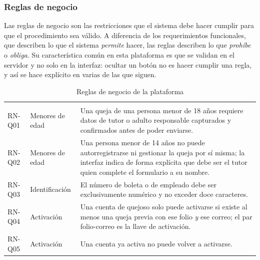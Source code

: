 	\normalsize
	
	\subsubsection{Reglas de negocio}
	Las reglas de negocio son las restricciones que el sistema debe hacer cumplir para que el
	procedimiento sea válido. A diferencia de los requerimientos funcionales, que describen lo que
	el sistema \emph{permite} hacer, las reglas describen lo que \emph{prohíbe} o \emph{obliga}. Su
	característica común en esta plataforma es que se validan en el servidor y no solo en la
	interfaz: ocultar un botón no es hacer cumplir una regla, y así se hace explícito en varias de
	las que siguen.
	
	\small
	\renewcommand{\arraystretch}{1.2}
	
	\begin{longtable}{|p{1.7cm}|p{2.7cm}|p{9.7cm}|}
		\caption{Reglas de negocio de la plataforma}
		\label{tab:reglas_negocio} \\
		\hline
		\rowcolor{headerblue}
		\headercell{ID} & \headercell{Temática} & \headercell{Regla} \\
		\hline
		\endfirsthead
	
		\hline
		\rowcolor{headerblue}
		\headercell{ID} & \headercell{Temática} & \headercell{Regla} \\
		\hline
		\endhead
	
		RN-Q01 & Menores de edad & Una queja de una persona menor de 18 años requiere datos de tutor
		o adulto responsable capturados y confirmados antes de poder enviarse. \\ \hline
	
		RN-Q02 & Menores de edad & Una persona menor de 14 años no puede autorregistrarse ni
		gestionar la queja por sí misma; la interfaz indica de forma explícita que debe ser el tutor
		quien complete el formulario a su nombre. \\ \hline
	
		RN-Q03 & Identificación & El número de boleta o de empleado debe ser exclusivamente numérico
		y no exceder doce caracteres. \\ \hline
	
		RN-Q04 & Activación & Una cuenta de quejoso solo puede activarse si existe al menos una queja
		previa con ese folio \emph{y} ese correo; el par folio-correo es la llave de activación.
		\\ \hline
	
		RN-Q05 & Activación & Una cuenta ya activa no puede volver a activarse. \\ \hline
	

\end{longtable}
